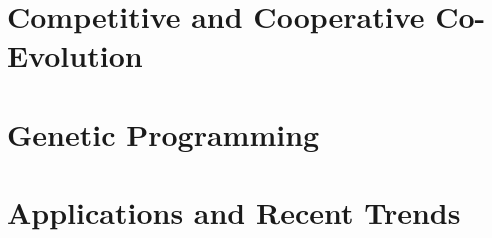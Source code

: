 \documentclass{report}
\begin{document}
\chapter{Competitive and Cooperative Co-Evolution}


\chapter{Genetic Programming}


\chapter{Applications and Recent Trends}


% 
\end{document}
